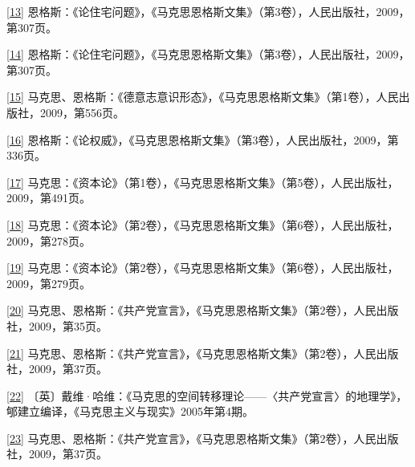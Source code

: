 \documentclass[UTF8, fontset = sourcesans, a4paper, oneside, zihao =
-4, scheme=chinese, no-math, space=true]{ctexbook}
\begin{document}
\protect\hypertarget{part0010_split_002.htmlux5cux23m13}{}{}\protect\hyperlink{part0010_split_002.htmlux5cux23w13}{{[}13{]}}
恩格斯：《论住宅问题》，《马克思恩格斯文集》（第3卷），人民出版社，2009，第307页。

\protect\hypertarget{part0010_split_002.htmlux5cux23m14}{}{}\protect\hyperlink{part0010_split_002.htmlux5cux23w14}{{[}14{]}}
恩格斯：《论住宅问题》，《马克思恩格斯文集》（第3卷），人民出版社，2009，第307页。

\protect\hypertarget{part0010_split_002.htmlux5cux23m15}{}{}\protect\hyperlink{part0010_split_002.htmlux5cux23w15}{{[}15{]}}
马克思、恩格斯：《德意志意识形态》，《马克思恩格斯文集》（第1卷），人民出版社，2009，第556页。

\protect\hypertarget{part0010_split_002.htmlux5cux23m16}{}{}\protect\hyperlink{part0010_split_002.htmlux5cux23w16}{{[}16{]}}
恩格斯：《论权威》，《马克思恩格斯文集》（第3卷），人民出版社，2009，第336页。

\protect\hypertarget{part0010_split_002.htmlux5cux23m17}{}{}\protect\hyperlink{part0010_split_002.htmlux5cux23w17}{{[}17{]}}
马克思：《资本论》（第1卷），《马克思恩格斯文集》（第5卷），人民出版社，2009，第491页。

\protect\hypertarget{part0010_split_002.htmlux5cux23m18}{}{}\protect\hyperlink{part0010_split_002.htmlux5cux23w18}{{[}18{]}}
马克思：《资本论》（第2卷），《马克思恩格斯文集》（第6卷），人民出版社，2009，第278页。

\protect\hypertarget{part0010_split_002.htmlux5cux23m19}{}{}\protect\hyperlink{part0010_split_002.htmlux5cux23w19}{{[}19{]}}
马克思：《资本论》（第2卷），《马克思恩格斯文集》（第6卷），人民出版社，2009，第279页。

\protect\hypertarget{part0010_split_002.htmlux5cux23m20}{}{}\protect\hyperlink{part0010_split_002.htmlux5cux23w20}{{[}20{]}}
马克思、恩格斯：《共产党宣言》，《马克思恩格斯文集》（第2卷），人民出版社，2009，第35页。

\protect\hypertarget{part0010_split_002.htmlux5cux23m21}{}{}\protect\hyperlink{part0010_split_002.htmlux5cux23w21}{{[}21{]}}
马克思、恩格斯：《共产党宣言》，《马克思恩格斯文集》（第2卷），人民出版社，2009，第37页。

\protect\hypertarget{part0010_split_002.htmlux5cux23m22}{}{}\protect\hyperlink{part0010_split_002.htmlux5cux23w22}{{[}22{]}}
〔英〕戴维·哈维：《马克思的空间转移理论------〈共产党宣言〉的地理学》，郇建立编译，《马克思主义与现实》2005年第4期。

\protect\hypertarget{part0010_split_002.htmlux5cux23m23}{}{}\protect\hyperlink{part0010_split_002.htmlux5cux23w23}{{[}23{]}}
马克思、恩格斯：《共产党宣言》，《马克思恩格斯文集》（第2卷），人民出版社，2009，第37页。
\end{document}
